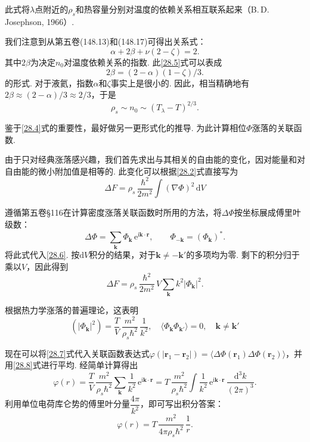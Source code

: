 此式将$\lambda$点附近的$\rho_{s}$和热容量分别对温度的依赖关系相互联系起来（B.\,D.\,Josephson, 1966）.

我们注意到从第五卷(148.13)和(148.17)可得出关系式：
\begin{equation}
\alpha+2\beta+\nu(2-\zeta)=2.
\label{28.5}
\end{equation}
其中$2\beta$为决定$n_{0}$对温度依赖关系的指数. 此\eqref{28.5}式可以表成
\begin{equation*}
2\beta=(2-\alpha)(1-\zeta)/3.
\end{equation*}
的形式. 对于液氦，指数$\alpha$和$\zeta$事实上是很小的. 因此，相当精确地有$2\beta\approx(2-\alpha)/3\approx 2/3$，于是
\begin{equation*}
\rho_{s}\sim n_{0}\sim(T_{\lambda}-T)^{2/3}.
\end{equation*}

鉴于\eqref{28.4}式的重要性，最好做另一更形式化的推导. 为此计算相位$\Phi$涨落的关联函数.

由于只对经典涨落感兴趣，我们首先求出与其相关的自由能的变化，因对能量和对自由能的微小附加值是相等的. 此变化可以根据\eqref{28.2}式直接写为
\begin{equation}
\Delta F=\rho_{s}\,\frac{\hbar^{2}}{2m^{2}}\int(\nabla\Phi)^{2}\,\mathrm{d}V
\label{28.6}
\end{equation}

遵循第五卷§116在计算密度涨落关联函数时所用的方法，将$\Delta\Phi$按坐标展成傅里叶级数：
\begin{equation}
\Delta\Phi=\sum_{\bm{k}}\Phi_{\bm{k}}\,\mathrm{e}^{\mathrm{i}\bm{k}\cdot\bm{r}},\qquad
\Phi_{-\bm{k}}=(\Phi_{\bm{k}})^{*}.
\label{28.7}
\end{equation}
将此式代入\eqref{28.6}. 按$\mathrm{d}V$积分的结果，对于$\bm{k}\neq-\bm{k}'$的多项均为零. 剩下的积分归于乘以$V$，因此得到
\begin{equation*}
\Delta F=\rho_{s}\,\frac{\hbar^{2}}{2m^{2}}\,V\sum_{\bm{k}}k^{2}\vert\Phi_{\bm{k}}\vert^{2}.
\end{equation*}

根据热力学涨落的普遍理论，这表明
\begin{equation}
(\vert\Phi_{\bm{k}}\vert^{2})=\frac{T}{V}\,\frac{m^{2}}{\rho_{s}\hbar^{2}}\,\frac{1}{k^{2}},\quad
\langle\Phi_{\bm{k}}\Phi_{\bm{k}'}\rangle=0,\quad\bm{k}\neq\bm{k}'
\label{28.8}
\end{equation}

现在可以将\eqref{28.7}式代入关联函数表达式$\varphi(\vert\bm{r}_{1}-\bm{r}_{2}\vert)=\langle\Delta\Phi(\bm{r}_{1})\Delta\Phi(\bm{r}_{2})\rangle$，并用\eqref{28.8}式进行平均. 经简单计算得出
\begin{equation}
\varphi(r)=\frac{T}{V}\,\frac{m^{2}}{\rho_{s}\hbar^{2}}\sum_{\bm{k}}\frac{1}{k^{2}}\,
\mathrm{e}^{\mathrm{i}\bm{k}\cdot\bm{r}}
=T\,\frac{m^{2}}{\rho_{s}\hbar^{2}}\int\frac{1}{k^{2}}\,
\mathrm{e}^{\mathrm{i}\bm{k}\cdot\bm{r}}\,\frac{\mathrm{d}^{3}k}{(2\pi)^{3}}.
\label{28.9}
\end{equation}
利用单位电荷库仑势的傅里叶分量$\dfrac{4\pi}{k^{2}}$，即可写出积分答案：
\begin{equation}
\varphi(r)=T\,\frac{m^{2}}{4\pi\rho_{s}\hbar^{2}}\,\frac{1}{r}.
\label{28.10}
\end{equation}

